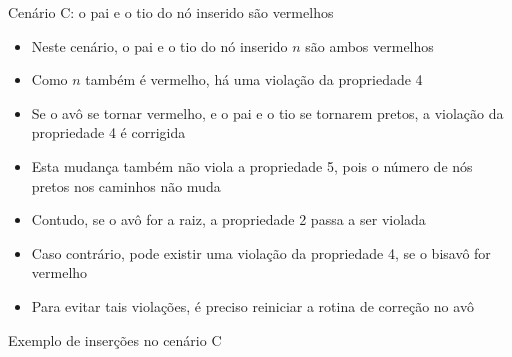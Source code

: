\begin{frame}[fragile]{Cenário C: o pai e o tio do nó inserido são vermelhos}

    \begin{itemize}
        \item Neste cenário, o pai e o tio do nó inserido $n$ são ambos vermelhos

        \item Como $n$ também é vermelho, há uma violação da propriedade 4

        \item Se o avô se tornar vermelho, e o pai e o tio se tornarem pretos, a violação da
            propriedade 4 é corrigida

        \item Esta mudança também não viola a propriedade 5, pois o número de nós pretos
            nos caminhos não muda

        \item Contudo, se o avô for a raiz, a propriedade 2 passa a ser violada

        \item Caso contrário, pode existir uma violação da propriedade 4, se o bisavô for
            vermelho

        \item Para evitar tais violações, é preciso reiniciar a rotina de correção no avô
    \end{itemize}

\end{frame}

\begin{frame}[fragile]{Exemplo de inserções no cenário C}


\end{frame}


